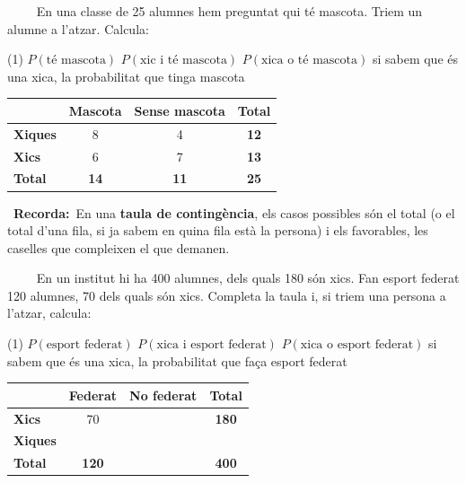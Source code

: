 \documentclass[11pt,a4paper]{article}
\newcommand{\estrelles}[1]{{\color{accent}\ifcase#1\or\faStar\faStar[regular]\faStar[regular]\or\faStar\faStar\faStar[regular]\or\faStar\faStar\faStar\fi}}
\newcounter{exer}
\newcommand{\ex}[1]{\par\needspace{4\baselineskip}\medskip\stepcounter{exer}\noindent{\color{navy}\bfseries\theexer.}\ \ {\small\estrelles{#1}}\ \ }
\newcommand{\recorda}[1]{\par\smallskip\begin{tcolorbox}[colback=accent!7,colframe=accent!55,arc=2mm,boxrule=0.5pt,left=2.5mm,right=2.5mm,top=1mm,bottom=1mm]\small{\color{accent}\faLightbulb[regular]}\ \textbf{Recorda:}\ #1\end{tcolorbox}}
\begin{document}
\ex{1} En una classe de 25 alumnes hem preguntat qui té mascota. Triem un alumne a l'atzar. Calcula:
\begin{tasks}(1)
  \task $P(\text{té mascota})$
  \task $P(\text{xic i té mascota})$
  \task $P(\text{xica o té mascota})$
  \task si sabem que és una xica, la probabilitat que tinga mascota
\end{tasks}
\par\smallskip\begin{center}{\small\renewcommand{\arraystretch}{1.3}\begin{tabular}{l|cc|c}
\rowcolor{soft} & Mascota & Sense mascota & Total\\\hline
\cellcolor{soft}\textbf{Xiques} & 8 & 4 & \textbf{12}\\
\cellcolor{soft}\textbf{Xics} & 6 & 7 & \textbf{13}\\\hline
\cellcolor{soft}\textbf{Total} & \textbf{14} & \textbf{11} & \textbf{25}\\
\end{tabular}}\end{center}\recorda{En una \textbf{taula de contingència}, els casos possibles són el total (o el total d'una fila, si ja sabem en quina fila està la persona) i els favorables, les caselles que compleixen el que demanen.}

\ex{2} En un institut hi ha 400 alumnes, dels quals 180 són xics. Fan esport federat 120 alumnes, 70 dels quals són xics. Completa la taula i, si triem una persona a l'atzar, calcula:
\begin{tasks}(1)
  \task $P(\text{esport federat})$
  \task $P(\text{xica i esport federat})$
  \task $P(\text{xica o esport federat})$
  \task si sabem que és una xica, la probabilitat que faça esport federat
\end{tasks}
\par\smallskip\begin{center}{\small\renewcommand{\arraystretch}{1.3}\begin{tabular}{l|cc|c}
\rowcolor{soft} & Federat & No federat & Total\\\hline
\cellcolor{soft}\textbf{Xics} & 70 & \phantom{000} & \textbf{180}\\
\cellcolor{soft}\textbf{Xiques} & \phantom{000} & \phantom{000} & \phantom{000}\\\hline
\cellcolor{soft}\textbf{Total} & \textbf{120} & \phantom{000} & \textbf{400}\\
\end{tabular}}\end{center}
\end{document}
